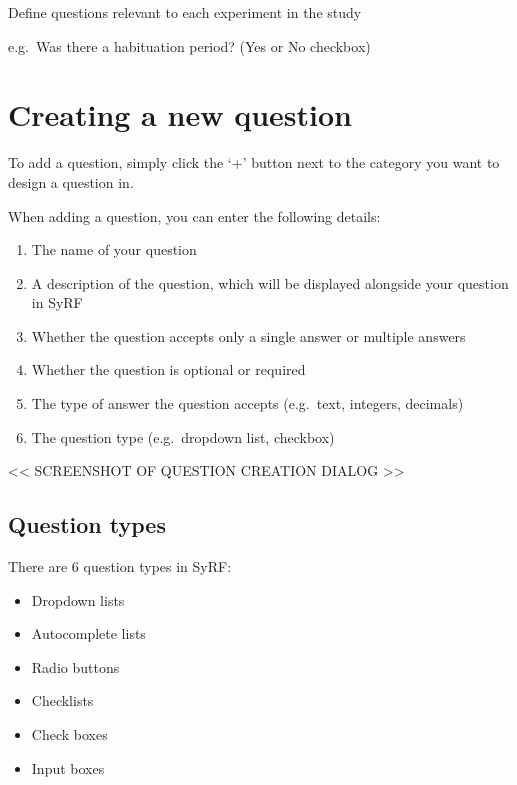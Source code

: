 \documentclass[
]{book}
\providecommand{\tightlist}{%
  \setlength{\itemsep}{0pt}\setlength{\parskip}{0pt}}
\begin{document}
Define questions relevant to each experiment in the study

e.g.~Was there a habituation period?
(Yes or No checkbox)

\hypertarget{creating-a-new-question}{%
\section{Creating a new question}\label{creating-a-new-question}}

To add a question, simply click the `+' button next to the category you want to design a question in.

When adding a question, you can enter the following details:

\begin{enumerate}
\def\labelenumi{\arabic{enumi}.}
\tightlist
\item
  The name of your question
\item
  A description of the question, which will be displayed alongside your question in SyRF
\item
  Whether the question accepts only a single answer or multiple answers
\item
  Whether the question is optional or required
\item
  The type of answer the question accepts (e.g.~text, integers, decimals)
\item
  The question type (e.g.~dropdown list, checkbox)
\end{enumerate}

\textless{}\textless{} SCREENSHOT OF QUESTION CREATION DIALOG \textgreater{}\textgreater{}

\hypertarget{question-types}{%
\subsection{Question types}\label{question-types}}

There are 6 question types in SyRF:

\begin{itemize}
\tightlist
\item
  Dropdown lists
\item
  Autocomplete lists
\item
  Radio buttons
\item
  Checklists
\item
  Check boxes
\item
  Input boxes
\end{itemize}
\end{document}
